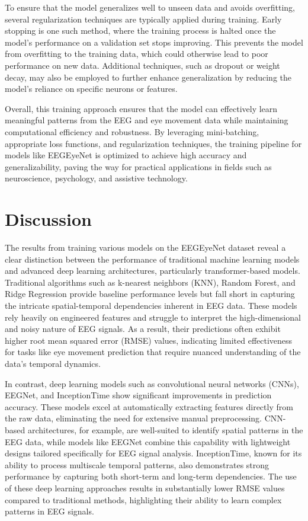 \documentclass{article}
\begin{document}
To ensure that the model generalizes well to unseen data and avoids overfitting, several regularization techniques are typically applied during training. Early stopping is one such method, where the training process is halted once the model's performance on a validation set stops improving. This prevents the model from overfitting to the training data, which could otherwise lead to poor performance on new data. Additional techniques, such as dropout or weight decay, may also be employed to further enhance generalization by reducing the model's reliance on specific neurons or features.

Overall, this training approach ensures that the model can effectively learn meaningful patterns from the EEG and eye movement data while maintaining computational efficiency and robustness. By leveraging mini-batching, appropriate loss functions, and regularization techniques, the training pipeline for models like EEGEyeNet is optimized to achieve high accuracy and generalizability, paving the way for practical applications in fields such as neuroscience, psychology, and assistive technology.

\section {Discussion}

The results from training various models on the EEGEyeNet dataset reveal a clear distinction between the performance of traditional machine learning models and advanced deep learning architectures, particularly transformer-based models. Traditional algorithms such as k-nearest neighbors (KNN), Random Forest, and Ridge Regression provide baseline performance levels but fall short in capturing the intricate spatial-temporal dependencies inherent in EEG data. These models rely heavily on engineered features and struggle to interpret the high-dimensional and noisy nature of EEG signals. As a result, their predictions often exhibit higher root mean squared error (RMSE) values, indicating limited effectiveness for tasks like eye movement prediction that require nuanced understanding of the data's temporal dynamics.

In contrast, deep learning models such as convolutional neural networks (CNNs), EEGNet, and InceptionTime show significant improvements in prediction accuracy. These models excel at automatically extracting features directly from the raw data, eliminating the need for extensive manual preprocessing. CNN-based architectures, for example, are well-suited to identify spatial patterns in the EEG data, while models like EEGNet combine this capability with lightweight designs tailored specifically for EEG signal analysis. InceptionTime, known for its ability to process multiscale temporal patterns, also demonstrates strong performance by capturing both short-term and long-term dependencies. The use of these deep learning approaches results in substantially lower RMSE values compared to traditional methods, highlighting their ability to learn complex patterns in EEG signals.
\end{document}

